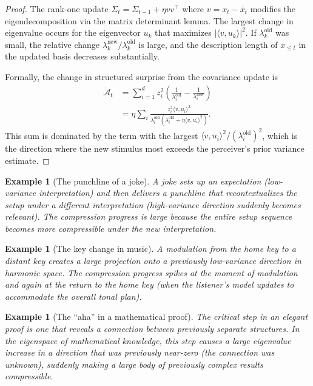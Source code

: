 \documentclass[journal]{IEEEtran}
\newtheorem{example}[theorem]{Example}
\newcommand{\ip}[2]{\langle #1, #2 \rangle}
\begin{document}
\begin{proof}
The rank-one update $\Sigma_t = \Sigma_{t-1} + \eta v v^\top$
where $v = x_t - \bar{x}_t$ modifies the eigendecomposition via the
matrix determinant lemma.  The largest change in eigenvalue occurs
for the eigenvector $u_k$ that maximizes $|\ip{v}{u_k}|^2$.  If
$\lambda_k^{\mathrm{old}}$ was small, the relative change
$\lambda_k^{\mathrm{new}} / \lambda_k^{\mathrm{old}}$ is large,
and the description length of $x_{\leq t}$ in the updated basis
decreases substantially.

Formally, the change in structured surprise from the covariance
update is
\begin{align}
    \dot{\mathcal{A}}_t &= \sum_{i=1}^d z_i^2
    \left(\frac{1}{\lambda_i^{\mathrm{old}}} -
    \frac{1}{\lambda_i^{\mathrm{new}}}\right) \\
    &= \eta \sum_i \frac{z_i^2 \ip{v}{u_i}^2}
    {\lambda_i^{\mathrm{old}}(\lambda_i^{\mathrm{old}} +
    \eta \ip{v}{u_i}^2)}.
\end{align}
This sum is dominated by the term with the largest
$\ip{v}{u_i}^2 / (\lambda_i^{\mathrm{old}})^2$, which is the
direction where the new stimulus most exceeds the perceiver's prior
variance estimate.
\end{proof}

\begin{example}[The punchline of a joke]
A joke sets up an expectation (low-variance interpretation) and then
delivers a punchline that recontextualizes the setup under a different
interpretation (high-variance direction suddenly becomes relevant).
The compression progress is large because the entire setup sequence
becomes more compressible under the new interpretation.
\end{example}

\begin{example}[The key change in music]
A modulation from the home key to a distant key creates a large
projection onto a previously low-variance direction in harmonic space.
The compression progress spikes at the moment of modulation and again
at the return to the home key (when the listener's model updates to
accommodate the overall tonal plan).
\end{example}

\begin{example}[The ``aha'' in a mathematical proof]
The critical step in an elegant proof is one that reveals a
connection between previously separate structures.  In the
eigenspace of mathematical knowledge, this step causes a large
eigenvalue increase in a direction that was previously near-zero
(the connection was unknown), suddenly making a large body of
previously complex results compressible.
\end{example}
\end{document}
